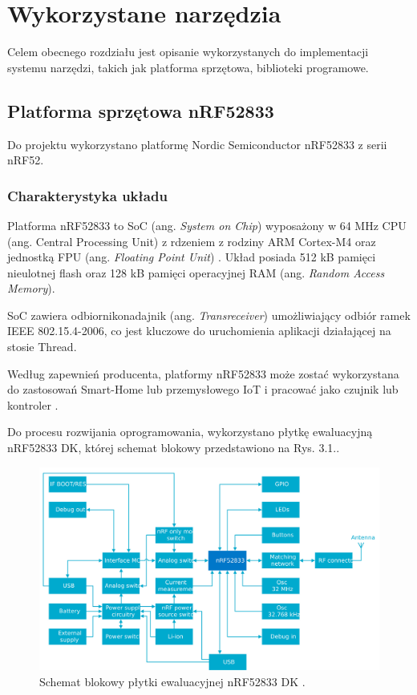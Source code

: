\chapter{Wykorzystane narzędzia}
\label{cha:narzedzia}

Celem obecnego rozdziału jest opisanie wykorzystanych do implementacji systemu narzędzi, takich jak platforma sprzętowa, biblioteki programowe.

\section{Platforma sprzętowa nRF52833}

Do projektu wykorzystano platformę Nordic Semiconductor nRF52833 z serii nRF52.

\subsection{Charakterystyka układu}

    Platforma nRF52833 to SoC (ang. \textit{System on Chip}) wyposażony w 64 MHz CPU (ang. Central Processing Unit) z rdzeniem z rodziny ARM Cortex-M4 oraz jednostką FPU (ang. \textit{Floating Point Unit}) \cite{nrf52833-characteristics}.
    Układ posiada 512 kB pamięci nieulotnej flash oraz 128 kB pamięci operacyjnej RAM (ang. \textit{Random Access Memory}).

    SoC zawiera odbiornikonadajnik (ang. \textit{Transreceiver}) umożliwiający odbiór ramek IEEE 802.15.4-2006, co jest kluczowe do uruchomienia aplikacji działającej na stosie Thread.

    Według zapewnień producenta, platformy nRF52833 może zostać wykorzystana do zastosowań Smart-Home lub przemysłowego IoT i pracować jako czujnik lub kontroler \cite{nrf52833-characteristics}.

    Do procesu rozwijania oprogramowania, wykorzystano płytkę ewaluacyjną nRF52833 DK, której schemat blokowy przedstawiono na Rys. 3.1..

    \begin{figure}[H]
        \centering
        \includegraphics[width=0.8\linewidth]{graphics/nrf52833DK_block_diagram.jpg}
        \caption{Schemat blokowy płytki ewaluacyjnej nRF52833 DK \cite{nrf52833-diagram}.}
        \label{fig:nrf8233-block-diagram}
    \end{figure}

